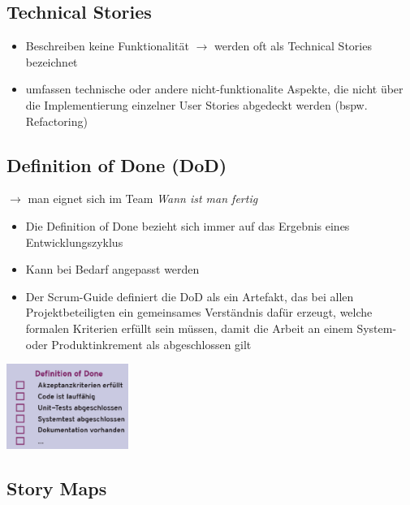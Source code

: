 \documentclass{report}
\newenvironment{Figure}
	{\par\medskip\noindent\minipage{\linewidth}}
	{\endminipage\par\medskip}
\theoremstyle{definition}
\theoremstyle{example}
\begin{document}
\subsection{Technical Stories}
\begin{itemize}
   \item Beschreiben keine Funktionalität $\rightarrow$ werden oft als Technical Stories bezeichnet
   \item umfassen technische oder andere nicht-funktionalite Aspekte, die nicht über die Implementierung einzelner User Stories abgedeckt werden (bspw. Refactoring)
\end{itemize}

\subsection{Definition of Done (DoD)}
$\rightarrow$ man eignet sich im Team \textit{Wann ist man fertig}
\begin{itemize}
   \item Die Definition of Done bezieht sich immer auf das Ergebnis eines Entwicklungszyklus
   \item Kann bei Bedarf angepasst werden
   \item Der Scrum-Guide definiert die DoD als ein Artefakt, das bei allen Projektbeteiligten ein gemeinsames Verständnis dafür erzeugt, welche formalen Kriterien erfüllt sein müssen, damit die Arbeit an einem System- oder Produktinkrement als abgeschlossen gilt
\end{itemize}

\begin{Figure}
   \centering
    \includegraphics[width=150px]{img/DoD.png}
        \label{fig:Beispiel DoD}
\end{Figure}

\subsection{Story Maps}
\end{document}
